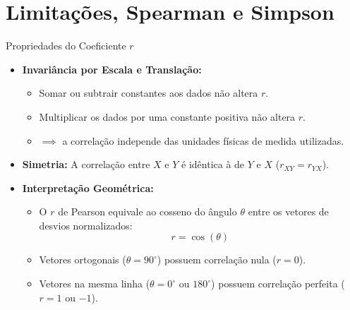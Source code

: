 \section{Limitações, Spearman e Simpson}

\begin{frame}{Propriedades do Coeficiente $r$}
    \begin{itemize}
        \item \textbf{Invariância por Escala e Translação:}
        \begin{itemize}
            \item Somar ou subtrair constantes aos dados não altera $r$.
            \item Multiplicar os dados por uma constante positiva não altera $r$.
            \item $\implies$ a correlação independe das unidades físicas de medida utilizadas.
        \end{itemize}
        \item \textbf{Simetria:} A correlação entre $X$ e $Y$ é idêntica à de $Y$ e $X$ ($r_{XY} = r_{YX}$).
        \item \textbf{Interpretação Geométrica:}
        \begin{itemize}
            \item O $r$ de Pearson equivale ao cosseno do ângulo $\theta$ entre os vetores de desvios normalizados:
            $$r = \cos(\theta)$$
            \item Vetores ortogonais ($\theta = 90^\circ$) possuem correlação nula ($r = 0$).
            \item Vetores na mesma linha ($\theta = 0^\circ$ ou $180^\circ$) possuem correlação perfeita ($r = 1$ ou $-1$).
        \end{itemize}
    \end{itemize}
\end{frame}

